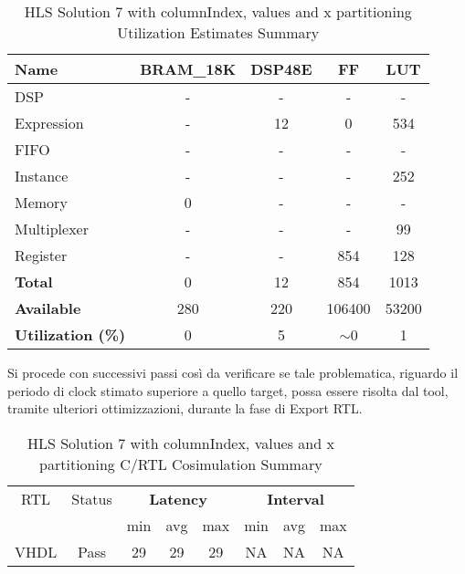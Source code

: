 \begin{table}[H]
	\centering
	\begin{tabular}{|l|c|c|c|c|}
		\hline
		\textbf{Name}    & \textbf{BRAM\_18K} & \textbf{DSP48E} & \textbf{FF} & \textbf{LUT} \\ \hline
		DSP              & -                   & -               & -           & -            \\ 
		Expression       & -                   & 12              & 0           & 534          \\ 
		FIFO             & -                   & -               & -           & -            \\ 
		Instance         & -                   & -               & -           & 252            \\ 
		Memory           & 0                   & -               & -          & -            \\ 
		Multiplexer      & -                   & -               & -           & 99          \\ 
		Register         & -                   & -               & 854         & 128            \\ \hline
		\textbf{Total}   & 0                   & 12               & 854         & 1013          \\ \hline
		\textbf{Available} & 280               & 220             & 106400      & 53200        \\ \hline
		\textbf{Utilization (\%)} & 0            & 5               & $\sim$0     & 1      \\ \hline
	\end{tabular}
	\caption{HLS Solution 7 with columnIndex, values and x partitioning Utilization Estimates Summary}
	\label{tab:hls-solution-7-columnindex-values-x-partitioning-utilization-estimates-summary}
\end{table}

Si procede con successivi passi così da verificare se tale problematica, riguardo il periodo di clock stimato superiore a quello target, possa essere risolta dal tool, tramite ulteriori ottimizzazioni, durante la fase di Export RTL.

\begin{table}[H]
	\centering
	\begin{tabular}{|c|c|c|c|c|c|c|c|}
		\hline
		\multicolumn{1}{|c|}{RTL} & \multicolumn{1}{|c|}{Status} & \multicolumn{3}{c|}{\textbf{Latency}} & \multicolumn{3}{c|}{\textbf{Interval}} \\
		&  & min & avg & max & min & avg & max \\
		\hline
		VHDL & Pass & 29 & 29 & 29 & NA & NA & NA \\
		\hline
	\end{tabular}
	\caption{HLS Solution 7 with columnIndex, values and x partitioning C/RTL Cosimulation Summary }
	\label{tab:hls-solution-7-columnindex-values-x-partitioning-cosimulation-summary}
\end{table}

